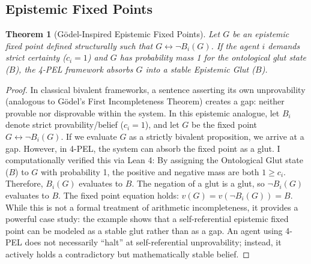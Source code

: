 \documentclass[11pt,a4paper]{article}
\newtheorem{theorem}{Theorem}[section]
\begin{document}
\subsection{Epistemic Fixed Points}
\begin{theorem}[G\"odel-Inspired Epistemic Fixed Points]
Let $G$ be an epistemic fixed point defined structurally such that $G \leftrightarrow \neg B_i(G)$. If the agent $i$ demands strict certainty ($c_i = 1$) and $G$ has probability mass 1 for the ontological glut state ($B$), the 4-PEL framework absorbs $G$ into a stable Epistemic Glut ($B$).
\end{theorem}
\begin{proof}
In classical bivalent frameworks, a sentence asserting its own unprovability (analogous to G\"odel's First Incompleteness Theorem) creates a gap: neither provable nor disprovable within the system. In this epistemic analogue, let $B_i$ denote strict provability/belief ($c_i = 1$), and let $G$ be the fixed point $G \leftrightarrow \neg B_i(G)$.
If we evaluate $G$ as a strictly bivalent proposition, we arrive at a gap. However, in 4-PEL, the system can absorb the fixed point as a glut. 
I computationally verified this via Lean 4: By assigning the Ontological Glut state ($B$) to $G$ with probability 1, the positive and negative mass are both $1 \ge c_i$. Therefore, $B_i(G)$ evaluates to $B$. The negation of a glut is a glut, so $\neg B_i(G)$ evaluates to $B$. The fixed point equation holds: $v(G) = v(\neg B_i(G)) = B$. 
While this is not a formal treatment of arithmetic incompleteness, it provides a powerful case study: the example shows that a self-referential epistemic fixed point can be modeled as a stable glut rather than as a gap. An agent using 4-PEL does not necessarily ``halt'' at self-referential unprovability; instead, it actively holds a contradictory but mathematically stable belief.
\end{proof}
\end{document}
